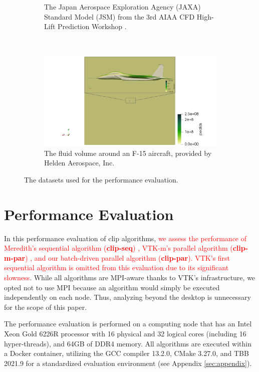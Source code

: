 \documentclass{egpubl}
\newcommand*{\fix}[1]{\textcolor{red}{#1}}
\begin{document}
\begin{figure}[H]
\begin{subfigure}[t]{0.957\linewidth}
    \caption{The Japan Aerospace Exploration Agency (JAXA) Standard Model (JSM) from the 3rd AIAA CFD High-Lift Prediction Workshop \cite{JAXAModel}.}
  \end{subfigure}
  \\
  \begin{subfigure}[t]{0.957\linewidth}
    \centering
    \includegraphics[width=\linewidth]{Figures/F15.png}
    \caption{The fluid volume around an F-15 aircraft, provided by Helden Aerospace, Inc.}
  \end{subfigure}
  \caption{The datasets used for the performance evaluation.}
  \label{fig:datasets}
\end{figure}

\section{Performance Evaluation}
\label{sec:perf-eval}

In this performance evaluation of clip algorithms, \fix{we assess the performance of Meredith's sequential algorithm (\textbf{clip-seq}) \cite{Clip}, VTK-m's parallel algorithm (\textbf{clip-m-par}) \cite{VTKm}, and our batch-driven parallel algorithm (\textbf{clip-par}). VTK's first sequential algorithm \cite{VTK} is omitted from this evaluation due to its significant slowness}. While all algorithms are MPI-aware thanks to VTK's infrastructure, we opted not to use MPI because an algorithm would simply be executed independently on each node. Thus, analyzing beyond the desktop is unnecessary for the scope of this paper.

The performance evaluation is performed on a computing node that has an Intel Xeon Gold 6226R processor with 16 physical and 32 logical cores (including 16 hyper-threads), and 64GB of DDR4 memory. All algorithms are executed within a Docker container, utilizing the GCC compiler 13.2.0, CMake 3.27.0, and TBB 2021.9 for a standardized evaluation environment  (see Appendix \ref{sec:appendix}).
\end{document}
